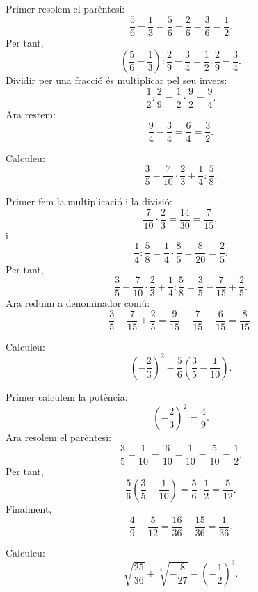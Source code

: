 \begin{solucio}
	Primer resolem el parèntesi:
	\[
		\frac{5}{6}-\frac{1}{3}
		=
		\frac{5}{6}-\frac{2}{6}
		=
		\frac{3}{6}
		=
		\frac{1}{2}.
	\]
	Per tant,
	\[
		\left(\frac{5}{6}-\frac{1}{3}\right):\frac{2}{9}-\frac{3}{4}
		=
		\frac{1}{2}:\frac{2}{9}-\frac{3}{4}.
	\]
	Dividir per una fracció és multiplicar pel seu invers:
	\[
		\frac{1}{2}:\frac{2}{9}
		=
		\frac{1}{2}\cdot\frac{9}{2}
		=
		\frac{9}{4}.
	\]
	Ara restem:
	\[
		\frac{9}{4}-\frac{3}{4}
		=
		\frac{6}{4}
		=
		\frac{3}{2}.
	\]
\end{solucio}

\begin{exercici}
	Calculeu:
	\[
		\frac{3}{5}
		-
		\frac{7}{10}\cdot\frac{2}{3}
		+
		\frac{1}{4}:\frac{5}{8}.
	\]
\end{exercici}

\begin{solucio}
	Primer fem la multiplicació i la divisió:
	\[
		\frac{7}{10}\cdot\frac{2}{3}
		=
		\frac{14}{30}
		=
		\frac{7}{15},
	\]
	i
	\[
		\frac{1}{4}:\frac{5}{8}
		=
		\frac{1}{4}\cdot\frac{8}{5}
		=
		\frac{8}{20}
		=
		\frac{2}{5}.
	\]
	Per tant,
	\[
		\frac{3}{5}
		-
		\frac{7}{10}\cdot\frac{2}{3}
		+
		\frac{1}{4}:\frac{5}{8}
		=
		\frac{3}{5}-\frac{7}{15}+\frac{2}{5}.
	\]
	Ara reduïm a denominador comú:
	\[
		\frac{3}{5}-\frac{7}{15}+\frac{2}{5}
		=
		\frac{9}{15}-\frac{7}{15}+\frac{6}{15}
		=
		\frac{8}{15}.
	\]
\end{solucio}

\begin{exercici}
	Calculeu:
	\[
		\left(-\frac{2}{3}\right)^2
		-
		\frac{5}{6}\left(\frac{3}{5}-\frac{1}{10}\right).
	\]
\end{exercici}

\begin{solucio}
	Primer calculem la potència:
	\[
		\left(-\frac{2}{3}\right)^2
		=
		\frac{4}{9}.
	\]
	Ara resolem el parèntesi:
	\[
		\frac{3}{5}-\frac{1}{10}
		=
		\frac{6}{10}-\frac{1}{10}
		=
		\frac{5}{10}
		=
		\frac{1}{2}.
	\]
	Per tant,
	\[
		\frac{5}{6}\left(\frac{3}{5}-\frac{1}{10}\right)
		=
		\frac{5}{6}\cdot\frac{1}{2}
		=
		\frac{5}{12}.
	\]
	Finalment,
	\[
		\frac{4}{9}-\frac{5}{12}
		=
		\frac{16}{36}-\frac{15}{36}
		=
		\frac{1}{36}.
	\]
\end{solucio}

\begin{exercici}
	Calculeu:
	\[
		\sqrt{\frac{25}{36}}
		+
		\sqrt[3]{-\frac{8}{27}}
		-
		\left(-\frac{1}{2}\right)^3.
	\]
\end{exercici}

